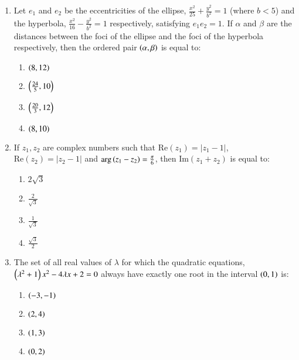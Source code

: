 \documentclass[journal,9pt,twocolumn]{IEEEtran}
\begin{document}
\begin{enumerate}
\item  Let $e_1$ and $e_2$ be the eccentricities of the ellipse, $\frac{x^2}{25} + \frac{y^2}{b^2} = 1$ (where $b < 5$) and the hyperbola, $\frac{x^2}{16} - \frac{y^2}{b^2} = 1$ respectively, satisfying $e_1 e_2 = 1$. If $\alpha$ and $\beta$ are the distances between the foci of the ellipse and the foci of the hyperbola respectively, then the ordered pair $\left(\alpha, \beta\right)$ is equal to:
        \begin{multicols}{2}

\begin{enumerate}
    \item $\left(8, 12\right)$
    \item $\left(\frac{24}{5}, 10\right)$
    \item $\left(\frac{20}{3}, 12\right)$
    \item $\left(8, 10\right)$
\end{enumerate}
\end{multicols}

\item If $z_1, z_2$ are complex numbers such that $\text{Re}(z_1) = |z_1 - 1|$, $\text{Re}(z_2) = |z_2 - 1|$ and $\arg\left(z_1 - z_2\right) = \frac{\pi}{6}$, then $\text{Im}(z_1 + z_2)$ is equal to:
        \begin{multicols}{4}

\begin{enumerate}
    \item $2\sqrt{3}$
    \item $\frac{2}{\sqrt{3}}$
    \item $\frac{1}{\sqrt{3}}$
    \item $\frac{\sqrt{3}}{2}$
\end{enumerate}
\end{multicols}

\item The set of all real values of $\lambda$ for which the quadratic equations, $\left(\lambda^2 + 1\right)x^2 - 4\lambda x + 2 = 0$ always have exactly one root in the interval $\left(0, 1\right)$ is:
        
        \begin{multicols}{2}
\begin{enumerate}
    \item $\left(-3, -1\right)$
    \item $\left(2, 4\right)$
    \item $\left(1, 3\right)$
    \item $\left(0, 2\right)$
\end{enumerate}
\end{multicols}


\end{enumerate}
\end{document}
